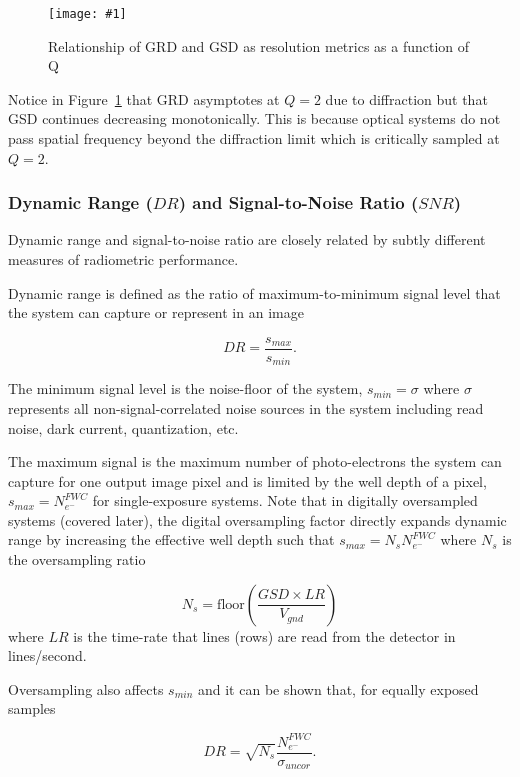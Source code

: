 \documentclass[]{spieman}  %
\newcommand{\includefigure}[3]
{
  \begin{figure}[h!tb]
  \centering
  \texttt{[image: \#1]}
  \caption[]{#3}
  \label{#2}
  \end{figure}
}
\begin{document}
\includefigure{figures/resolution_q.pgf}{fig:resolution_q}{Relationship of GRD and GSD as resolution metrics as a function of Q}

Notice in Figure~\ref{fig:resolution_q} that GRD asymptotes at $Q=2$ due to diffraction but that GSD continues decreasing monotonically.  This is because optical systems do not pass spatial frequency beyond the diffraction limit which is critically sampled at $Q=2$.

\subsubsection{Dynamic Range ($DR$) and Signal-to-Noise Ratio ($SNR$)}

Dynamic range and signal-to-noise ratio are closely related by subtly different measures of radiometric performance.

Dynamic range is defined as the ratio of maximum-to-minimum signal level that the system can capture or represent in an image

\begin{equation*}
    DR = \frac{s_{max}}{s_{min}}.
\end{equation*}

The minimum signal level is the noise-floor of the system, $s_{min} = \sigma$ where $\sigma$ represents all non-signal-correlated noise sources in the system including read noise, dark current, quantization, etc.

The maximum signal is the maximum number of photo-electrons the system can capture for one output image pixel and is limited by the well depth of a pixel, $s_{max} = N_{e^-}^{FWC}$ for single-exposure systems.  Note that in digitally oversampled systems (covered later), the digital oversampling factor directly expands dynamic range by increasing the effective well depth such that $s_{max} = N_s N_{e^-}^{FWC}$ where $N_s$ is the oversampling ratio

\begin{equation}
    N_s = \text{floor}\left(\frac{GSD \times LR}{V_{gnd}}\right)
    \label{eq:N_s}
\end{equation}
where $LR$ is the time-rate that lines (rows) are read from the detector in lines/second.

Oversampling also affects $s_{min}$ and it can be shown that, for equally exposed samples

\begin{equation}
    DR = \sqrt{N_s}\frac{N_{e^-}^{FWC}}{\sigma_{uncor}}.
\label{eq:DR_OS}
\end{equation}
\end{document}

